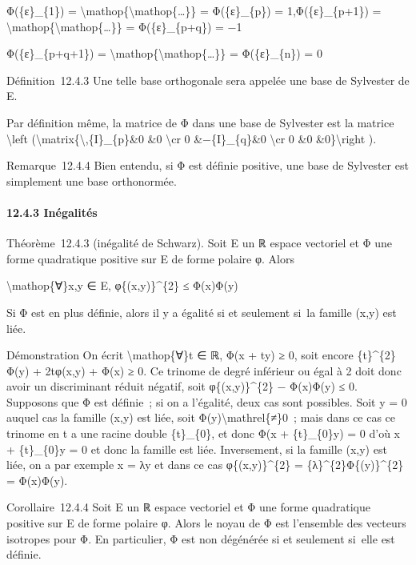 \documentclass[]{article}
\begin{document}
Φ(\{ε\}\_\{1\}) =
\textbackslash{}mathop\{\textbackslash{}mathop\{\ldots{}\}\} =
Φ(\{ε\}\_\{p\}) = 1,Φ(\{ε\}\_\{p+1\}) =
\textbackslash{}mathop\{\textbackslash{}mathop\{\ldots{}\}\} =
Φ(\{ε\}\_\{p+q\}) = −1

Φ(\{ε\}\_\{p+q+1\}) =
\textbackslash{}mathop\{\textbackslash{}mathop\{\ldots{}\}\} =
Φ(\{ε\}\_\{n\}) = 0

Définition~12.4.3 Une telle base orthogonale sera appelée une base de
Sylvester de E.

Par définition même, la matrice de Φ dans une base de Sylvester est la
matrice \textbackslash{}left
(\textbackslash{}matrix\{\textbackslash{},\{I\}\_\{p\}\&0 \&0
\textbackslash{}cr 0 \&−\{I\}\_\{q\}\&0 \textbackslash{}cr 0 \&0
\&0\}\textbackslash{}right ).

Remarque~12.4.4 Bien entendu, si Φ est définie positive, une base de
Sylvester est simplement une base orthonormée.

\paragraph{12.4.3 Inégalités}

Théorème~12.4.3 (inégalité de Schwarz). Soit E un ℝ espace vectoriel et
Φ une forme quadratique positive sur E de forme polaire φ. Alors

\textbackslash{}mathop\{∀\}x,y ∈ E, φ\{(x,y)\}\^{}\{2\} ≤ Φ(x)Φ(y)

Si Φ est en plus définie, alors il y a égalité si et seulement si~la
famille (x,y) est liée.

Démonstration On écrit \textbackslash{}mathop\{∀\}t ∈ ℝ, Φ(x + ty) ≥ 0,
soit encore \{t\}\^{}\{2\}Φ(y) + 2tφ(x,y) + Φ(x) ≥ 0. Ce trinome de
degré inférieur ou égal à 2 doit donc avoir un discriminant réduit
négatif, soit φ\{(x,y)\}\^{}\{2\} − Φ(x)Φ(y) ≤ 0. Supposons que Φ est
définie~; si on a l'égalité, deux cas sont possibles. Soit y = 0 auquel
cas la famille (x,y) est liée, soit Φ(y)\textbackslash{}mathrel\{≠\}0~;
mais dans ce cas ce trinome en t a une racine double \{t\}\_\{0\}, et
donc Φ(x + \{t\}\_\{0\}y) = 0 d'où x + \{t\}\_\{0\}y = 0 et donc la
famille est liée. Inversement, si la famille (x,y) est liée, on a par
exemple x = λy et dans ce cas φ\{(x,y)\}\^{}\{2\} =
\{λ\}\^{}\{2\}Φ\{(y)\}\^{}\{2\} = Φ(x)Φ(y).

Corollaire~12.4.4 Soit E un ℝ espace vectoriel et Φ une forme
quadratique positive sur E de forme polaire φ. Alors le noyau de Φ est
l'ensemble des vecteurs isotropes pour Φ. En particulier, Φ est non
dégénérée si et seulement si~elle est définie.
\end{document}
